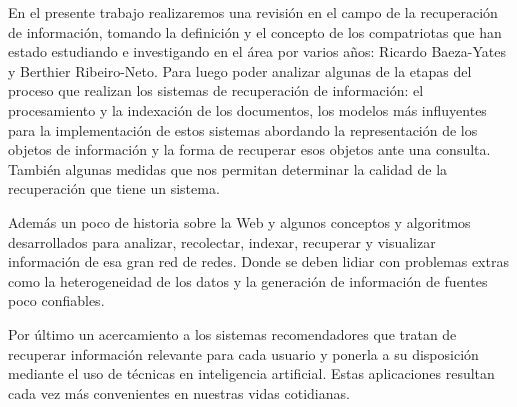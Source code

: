 En el presente trabajo realizaremos una revisión en el campo de la recuperación de información, tomando la definición y el concepto de los compatriotas que han estado estudiando e investigando en el área por varios años: Ricardo Baeza-Yates y Berthier Ribeiro-Neto. Para luego poder analizar algunas de la etapas del proceso que realizan los sistemas de recuperación de información: el procesamiento y la indexación de los documentos, los modelos más influyentes para la implementación de estos sistemas abordando la representación de los objetos de información y la forma de recuperar esos objetos ante una consulta. También algunas medidas que nos permitan determinar la calidad de la recuperación que tiene un sistema. \par
Además un poco de historia sobre la Web y algunos conceptos y algoritmos desarrollados para analizar, recolectar, indexar, recuperar y visualizar información de esa gran red de redes. Donde se deben lidiar con problemas extras como la heterogeneidad de los datos y la generación de información de fuentes poco confiables.\par
Por último un acercamiento a los sistemas recomendadores que tratan de recuperar información relevante para cada usuario y ponerla a su disposición mediante el uso de técnicas en inteligencia artificial. Estas aplicaciones resultan cada vez más convenientes en nuestras vidas cotidianas.
